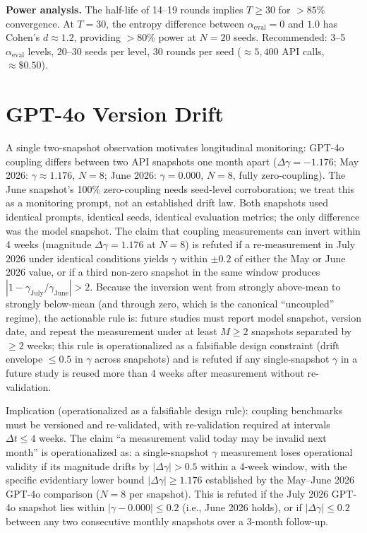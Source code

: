 \documentclass[11pt]{article}
\begin{document}
\textbf{Power analysis.} The half-life of 14--19 rounds implies $T \geq 30$ for $>85\%$ convergence. At $T{=}30$, the entropy difference between $\alpha_{\text{eval}} = 0$ and $1.0$ has Cohen's $d \approx 1.2$, providing $>80\%$ power at $N{=}20$ seeds. Recommended: 3--5 $\alpha_{\text{eval}}$ levels, 20--30 seeds per level, 30 rounds per seed ($\approx 5{,}400$ API calls, $\approx \$0.50$).

\section{GPT-4o Version Drift}

A single two-snapshot observation motivates longitudinal monitoring: GPT-4o coupling differs between two API snapshots one month apart ($\Delta\gamma = -1.176$; May 2026: $\gamma \approx 1.176$, $N{=}8$; June 2026: $\gamma = 0.000$, $N{=}8$, fully zero-coupling). The June snapshot's 100\% zero-coupling needs seed-level corroboration; we treat this as a monitoring prompt, not an established drift law. Both snapshots used identical prompts, identical seeds, identical evaluation metrics; the only difference was the model snapshot. The claim that coupling measurements can invert within 4 weeks (magnitude $\Delta\gamma = 1.176$ at $N{=}8$) is refuted if a re-measurement in July 2026 under identical conditions yields $\gamma$ within $\pm 0.2$ of either the May or June 2026 value, or if a third non-zero snapshot in the same window produces $|1 - \gamma_{\text{July}}/\gamma_{\text{June}}| > 2$. Because the inversion went from strongly above-mean to strongly below-mean (and through zero, which is the canonical ``uncoupled'' regime), the actionable rule is: future studies must report model snapshot, version date, and repeat the measurement under at least $M \geq 2$ snapshots separated by $\geq 2$ weeks; this rule is operationalized as a falsifiable design constraint (drift envelope $\leq 0.5$ in $\gamma$ across snapshots) and is refuted if any single-snapshot $\gamma$ in a future study is reused more than 4 weeks after measurement without re-validation.

Implication (operationalized as a falsifiable design rule): coupling benchmarks must be versioned and re-validated, with re-validation required at intervals $\Delta t \leq 4$ weeks. The claim ``a measurement valid today may be invalid next month'' is operationalized as: a single-snapshot $\gamma$ measurement loses operational validity if its magnitude drifts by $|\Delta\gamma| > 0.5$ within a 4-week window, with the specific evidentiary lower bound $|\Delta\gamma| \geq 1.176$ established by the May--June 2026 GPT-4o comparison ($N{=}8$ per snapshot). This is refuted if the July 2026 GPT-4o snapshot lies within $|\gamma - 0.000| \leq 0.2$ (i.e., June 2026 holds), or if $|\Delta\gamma| \leq 0.2$ between any two consecutive monthly snapshots over a 3-month follow-up.
\end{document}
